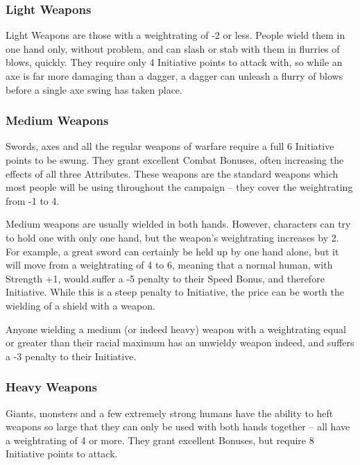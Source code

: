 \begin{multicols}{2}

\subsubsection{Light Weapons}

Light Weapons are those with a \gls{weightrating} of -2 or less. People wield them in one hand only, without problem, and can slash or stab with them in flurries of blows, quickly. They require only 4 Initiative points to attack with, so while an axe is far more damaging than a dagger, a dagger can unleash a flurry of blows before a single axe swing has taken place.

\subsubsection{Medium Weapons}

Swords, axes and all the regular weapons of warfare require a full 6 Initiative points to be swung.
They grant excellent Combat Bonuses, often increasing the effects of all three Attributes.
These weapons are the standard weapons which most people will be using throughout the campaign -- they cover the \gls{weightrating} from -1 to 4.

Medium weapons are usually wielded in both hands.
However, characters can try to hold one with only one hand, but the weapon's \gls{weightrating} increases by 2.
For example, a great sword can certainly be held up by one hand alone, but it will move from a \gls{weightrating} of 4 to 6, meaning that a normal human, with Strength +1, would suffer a -5 penalty to their Speed Bonus, and therefore Initiative.
While this is a steep penalty to Initiative, the price can be worth the wielding of a shield with a weapon.

Anyone wielding a medium (or indeed heavy) weapon with a \gls{weightrating} equal or greater than their racial maximum has an unwieldy weapon indeed, and suffers a -3 penalty to their Initiative.

\subsubsection{Heavy Weapons}

Giants, monsters and a few extremely strong humans have the ability to heft weapons so large that they can only be used with both hands together -- all have a \gls{weightrating} of 4 or more.
They grant excellent Bonuses, but require 8 Initiative points to attack.


\end{multicols}
